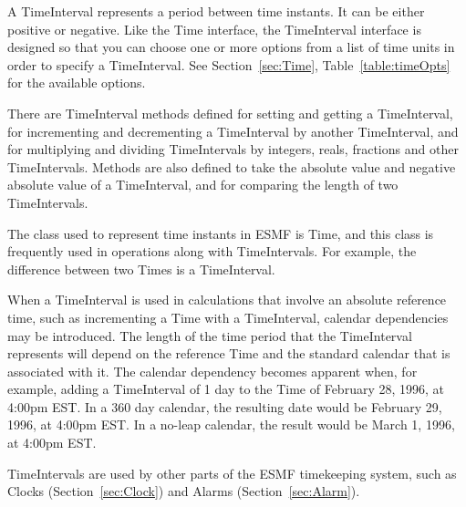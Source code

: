 \label{sec:TimeInterval}
A TimeInterval represents a period between time instants.  
It can be either positive or negative.  Like the Time interface, 
the TimeInterval interface is designed so that you can choose 
one or more options from a list of time units in order 
to specify a TimeInterval.  See Section~\ref{sec:Time}, 
Table~\ref{table:timeOpts} for the available options.

There are TimeInterval methods defined for setting and getting 
a TimeInterval, for incrementing and decrementing a TimeInterval 
by another TimeInterval, and for multiplying and dividing 
TimeIntervals by integers, reals, fractions and other TimeIntervals.  
Methods are also defined to take the absolute value and negative 
absolute value of a TimeInterval, and for comparing the length of two
TimeIntervals.

The class used to represent time instants in ESMF is Time,
and this class is frequently used in operations along with 
TimeIntervals.  For example, the difference between two
Times is a TimeInterval.  

When a TimeInterval is used in calculations that involve an absolute 
reference time, such as incrementing a Time with a TimeInterval, calendar 
dependencies may be introduced.  The length of the time period that the 
TimeInterval represents will depend on the reference Time and the 
standard calendar that is associated with it.  The calendar dependency becomes 
apparent when, for example, adding a TimeInterval of 1 day to the Time 
of February 28, 1996, at 4:00pm EST.  In a 360 day calendar, the 
resulting date would be February 29, 1996, at 4:00pm EST.  In a no-leap 
calendar, the result would be March 1, 1996, at 4:00pm EST.

TimeIntervals are used by other parts of the ESMF timekeeping
system, such as Clocks (Section~\ref{sec:Clock}) and Alarms 
(Section~\ref{sec:Alarm}).





